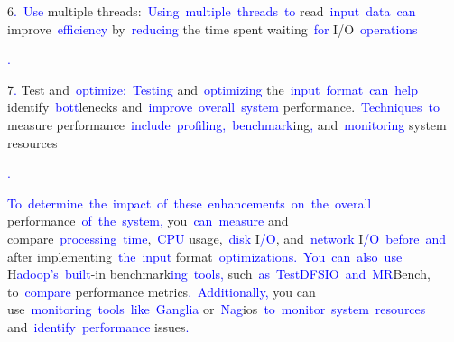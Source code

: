 \documentclass{article}
\begin{document}
\begin{tcolorbox}[colframe=black,colback=white]
{}6\textcolor{blue}{.}\textcolor{blue}{~Use} multiple threads:\textcolor{blue}{~Using}\textcolor{blue}{~multiple}\textcolor{blue}{~threads}\textcolor{blue}{~to} read\textcolor{blue}{~input}\textcolor{blue}{~data}\textcolor{blue}{~can} improve\textcolor{blue}{~efficiency} by\textcolor{blue}{~reducing} the time spent waiting\textcolor{blue}{~for} I/O\textcolor{blue}{~operations}\textcolor{blue}{.

}7\textcolor{blue}{.} Test and\textcolor{blue}{~optimize}\textcolor{blue}{:}\textcolor{blue}{~Testing} and\textcolor{blue}{~optimizing} the\textcolor{blue}{~input}\textcolor{blue}{~format}\textcolor{blue}{~can}\textcolor{blue}{~help} identify\textcolor{blue}{~bott}lenecks and\textcolor{blue}{~improve}\textcolor{blue}{~overall}\textcolor{blue}{~system} performance.\textcolor{blue}{~Techniques}\textcolor{blue}{~to} measure performance\textcolor{blue}{~include}\textcolor{blue}{~profiling}\textcolor{blue}{,}\textcolor{blue}{~benchmark}ing\textcolor{blue}{,} and\textcolor{blue}{~monitoring} system resources\textcolor{blue}{.

}\textcolor{blue}{To}\textcolor{blue}{~determine}\textcolor{blue}{~the}\textcolor{blue}{~impact}\textcolor{blue}{~of}\textcolor{blue}{~these}\textcolor{blue}{~enhancements}\textcolor{blue}{~on}\textcolor{blue}{~the}\textcolor{blue}{~overall} performance\textcolor{blue}{~of}\textcolor{blue}{~the}\textcolor{blue}{~system}\textcolor{blue}{,} you\textcolor{blue}{~can}\textcolor{blue}{~measure} and compare\textcolor{blue}{~processing}\textcolor{blue}{~time},\textcolor{blue}{~CPU} usage,\textcolor{blue}{~disk} I\textcolor{blue}{/O}, and\textcolor{blue}{~network} I\textcolor{blue}{/O}\textcolor{blue}{~before}\textcolor{blue}{~and} after implementing\textcolor{blue}{~the}\textcolor{blue}{~input} format\textcolor{blue}{~optimizations}\textcolor{blue}{.}\textcolor{blue}{~You}\textcolor{blue}{~can}\textcolor{blue}{~also}\textcolor{blue}{~use} H\textcolor{blue}{adoop}\textcolor{blue}{'s}\textcolor{blue}{~built}-in benchmark\textcolor{blue}{ing}\textcolor{blue}{~tools}\textcolor{blue}{,} such\textcolor{blue}{~as}\textcolor{blue}{~Test}\textcolor{blue}{DFS}\textcolor{blue}{IO}\textcolor{blue}{~and}\textcolor{blue}{~MR}Bench, to\textcolor{blue}{~compare} performance metrics\textcolor{blue}{.}\textcolor{blue}{~Additionally}\textcolor{blue}{,} you can use\textcolor{blue}{~monitoring}\textcolor{blue}{~tools}\textcolor{blue}{~like}\textcolor{blue}{~Gang}\textcolor{blue}{lia} or\textcolor{blue}{~Nag}ios\textcolor{blue}{~to}\textcolor{blue}{~monitor}\textcolor{blue}{~system}\textcolor{blue}{~resources} and\textcolor{blue}{~identify}\textcolor{blue}{~performance} issues\textcolor{blue}{.}\textcolor{blue}{}
\end{tcolorbox}
\end{document}
